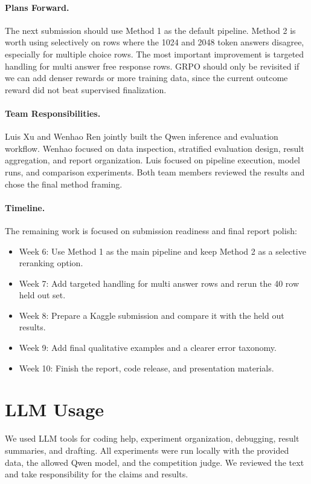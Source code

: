 \documentclass[11pt]{article}
\begin{document}
\paragraph{Plans Forward.}
The next submission should use Method 1 as the default pipeline. Method 2 is worth using selectively on rows where the 1024 and 2048 token answers disagree, especially for multiple choice rows. The most important improvement is targeted handling for multi answer free response rows. GRPO should only be revisited if we can add denser rewards or more training data, since the current outcome reward did not beat supervised finalization.

\paragraph{Team Responsibilities.}
Luis Xu and Wenhao Ren jointly built the Qwen inference and evaluation workflow. Wenhao focused on data inspection, stratified evaluation design, result aggregation, and report organization. Luis focused on pipeline execution, model runs, and comparison experiments. Both team members reviewed the results and chose the final method framing.

\paragraph{Timeline.}
The remaining work is focused on submission readiness and final report polish:
\begin{itemize}
  \item Week 6: Use Method 1 as the main pipeline and keep Method 2 as a selective reranking option.
  \item Week 7: Add targeted handling for multi answer rows and rerun the 40 row held out set.
  \item Week 8: Prepare a Kaggle submission and compare it with the held out results.
  \item Week 9: Add final qualitative examples and a clearer error taxonomy.
  \item Week 10: Finish the report, code release, and presentation materials.
\end{itemize}

\section*{LLM Usage}

We used LLM tools for coding help, experiment organization, debugging, result summaries, and drafting. All experiments were run locally with the provided data, the allowed Qwen model, and the competition judge. We reviewed the text and take responsibility for the claims and results.
\end{document}
